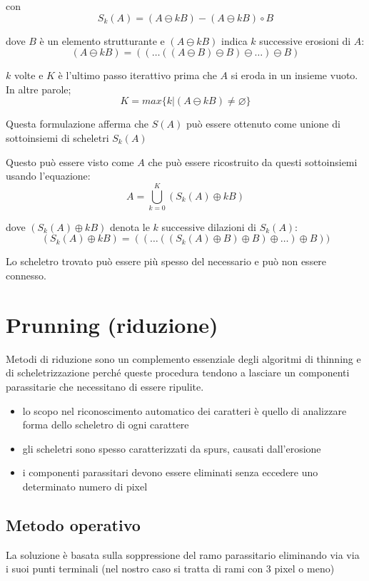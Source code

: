 con
$$
S_k(A) = (A \ominus k B) - (A \ominus k B) \circ B
$$

dove $B$ è un elemento strutturante e $(A \ominus k B)$ indica $k$ successive erosioni di $A$:
$$
(A \ominus k B) = ((\dots ((A \ominus B) \ominus B) \ominus \dots) \ominus B)
$$

$k$ volte e $K$ è l'ultimo passo iterattivo prima che $A$ si eroda in un insieme vuoto. In altre parole;
$$
K = max \{k | (A \ominus k B) \neq \varnothing \}
$$

Questa formulazione afferma che $S(A)$ può essere ottenuto come unione di sottoinsiemi di scheletri $S_k(A)$

Questo può essere visto come $A$ che può essere ricostruito da questi sottoinsiemi usando l'equazione:
$$
A = \bigcup_{k = 0}^{K}(S_k(A) \oplus k B)
$$

dove $(S_k(A) \oplus k B)$ denota le $k$ successive dilazioni di $S_k(A)$:
$$
(S_k(A) \oplus k B) = (( \dots ((S_k(A) \oplus B) \oplus B) \oplus \dots ) \oplus B))
$$

Lo scheletro trovato può essere più spesso del necessario e può non essere connesso.

\section{Prunning (riduzione)}
Metodi di riduzione sono un complemento essenziale degli algoritmi di thinning e di scheletrizzazione perché queste procedura tendono a lasciare un componenti parassitarie che necessitano di essere ripulite.

\begin{itemize}
	\item lo scopo nel riconoscimento automatico dei caratteri è quello di analizzare forma dello scheletro di ogni carattere
	
	\item gli scheletri sono spesso caratterizzati da spurs, causati dall'erosione
	
	\item i componenti parassitari devono essere eliminati senza eccedere uno determinato numero di pixel
\end{itemize}

\subsection{Metodo operativo}
La soluzione è basata sulla soppressione del ramo parassitario eliminando via via i suoi punti terminali (nel nostro caso si tratta di rami con 3 pixel o meno)

